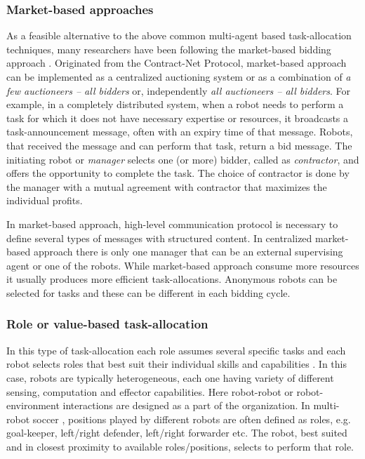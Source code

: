 \subsubsection*{Market-based approaches}
As a feasible alternative to the above common multi-agent based task-allocation techniques, many researchers have been following the market-based bidding approach . Originated from the Contract-Net Protocol, market-based approach can be implemented as a centralized auctioning system or as a combination of {\em a few auctioneers -- all bidders} or, independently {\em all auctioneers -- all bidders}. For example, in a completely distributed system, when a robot needs to perform a task for which it does not have necessary expertise or resources, it broadcasts a task-announcement message, often with  an expiry time of that message. Robots, that received the message and can perform that task, return a bid message. The initiating robot or {\em  manager} selects one (or more) bidder, called as {\em contractor}, and offers the opportunity to complete the task. The choice of contractor is done by the manager with a mutual agreement with contractor that maximizes the individual profits. 

In market-based approach, high-level communication protocol is necessary to define several types of messages with structured content. In centralized market-based approach there is only one manager that can be an external supervising agent or  one of the robots. While market-based approach consume more resources it usually produces more efficient task-allocations. Anonymous robots can be selected for tasks and these can be different in each bidding cycle.
%
\subsubsection*{Role or value-based task-allocation}
In this type of task-allocation each role assumes several specific tasks and each robot selects roles that best suit their individual skills and capabilities \cite{Chaimowicz2002}. In this case, robots are typically heterogeneous, each one having variety of different sensing, computation and effector capabilities. Here robot-robot or robot-environment interactions are designed as a part of the organization. In multi-robot soccer \cite{Stone+1999}, positions played by different  robots are often defined as roles, e.g. goal-keeper, left/right defender, left/right forwarder etc. The robot, best suited and in closest proximity to available roles/positions, selects to perform that role.
